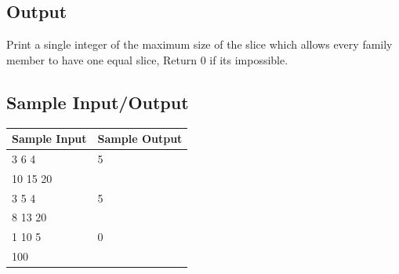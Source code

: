 \documentclass{article}
\begin{document}
\subsection{Output}

Print a single integer of the maximum size of the slice which allows every
family member to have one equal slice, Return 0 if its impossible.

\subsection{Sample Input/Output}

\begin{center}
    \begin{tabular}{ |l|l| }
        \hline
        Sample Input & Sample Output \\
        \hline
        3 6 4 & 5\\
        10 15 20 &\\
        \hline
        3 5 4 & 5\\
        8 13 20 &\\
        \hline
        1 10 5 & 0\\
        100 &\\
        \hline
    \end{tabular}
\end{center}
\end{document}
